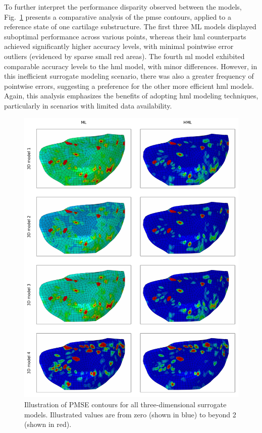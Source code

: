 To further interpret the performance disparity observed between the models, Fig.~\ref{fig:visualization} presents a comparative analysis of the \ac{pmse} contours, applied to a reference state of one cartilage substructure. The first three ML models displayed suboptimal performance across various points, whereas their \ac{hml} counterparts achieved significantly higher accuracy levels, with minimal pointwise error outliers (evidenced by sparse small red areas). The fourth \ac{ml} model exhibited comparable accuracy levels to the \ac{hml} model, with minor differences. However, in this inefficient surrogate modeling scenario, there was also a greater frequency of pointwise errors, suggesting a preference for the other more efficient \ac{hml} models. Again, this analysis emphasizes the benefits of adopting \ac{hml} modeling techniques, particularly in scenarios with limited data availability.
%
\begin{figure}\centering
\includegraphics[height=0.9\textheight]{visualization_3d.jpg}
\caption{Illustration of PMSE contours for all three-dimensional surrogate models. Illustrated values are from zero (shown in blue) to beyond 2 (shown in red).}\label{fig:visualization}
\end{figure}

